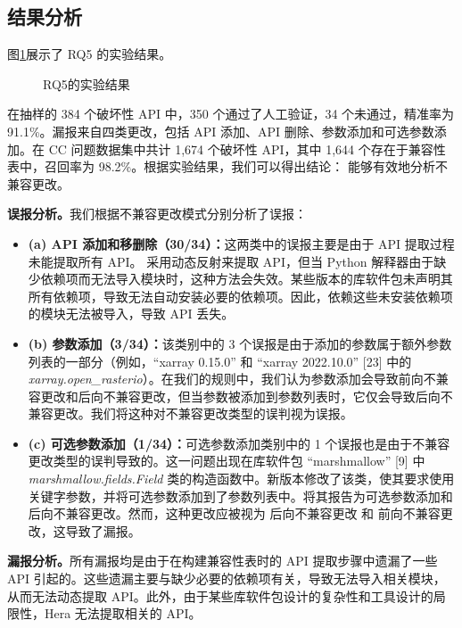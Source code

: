 \subsection{结果分析}
图\ref{fig:RQ5}展示了 RQ5 的实验结果。
\begin{figure}[htbp]
	\centering
	\subfloat[分析不兼容更改的精确率]{
		\texttt{[image: RQ2-1]}
		\label{fig:RQ5-1}
	}\hspace{4em}
	\subfloat[分析不兼容更改的召回率]{
		\texttt{[image: RQ2-2]}
		\label{fig:RQ5-2}
	}
	\caption{RQ5的实验结果}
	\label{fig:RQ5}
\end{figure}
在抽样的 384 个破坏性 API 中，350 个通过了人工验证，34 个未通过，精准率为 91.1\%。漏报来自四类更改，包括 API 添加、API 删除、参数添加和可选参数添加。在 CC 问题数据集中共计 1,674 个破坏性 API，其中 1,644 个存在于兼容性表中，召回率为 98.2\%。根据实验结果，我们可以得出结论：\tool{} 能够有效地分析不兼容更改。

\textbf{误报分析。}我们根据不兼容更改模式分别分析了误报：
\begin{itemize}
	\item \textbf{(a) API 添加和移删除（30/34）：}这两类中的误报主要是由于 API 提取过程未能提取所有 API。\tool{} 采用动态反射来提取 API，但当 Python 解释器由于缺少依赖项而无法导入模块时，这种方法会失效。某些版本的库软件包未声明其所有依赖项，导致无法自动安装必要的依赖项。因此，依赖这些未安装依赖项的模块无法被导入，导致 API 丢失。
	\item \textbf{ (b) 参数添加（3/34）：}该类别中的 3 个误报是由于添加的参数属于额外参数列表的一部分（例如，“xarray 0.15.0” 和 “xarray 2022.10.0” [23] 中的 \textit{xarray.open\_rasterio}）。在我们的规则中，我们认为参数添加会导致前向不兼容更改和后向不兼容更改，但当参数被添加到参数列表时，它仅会导致后向不兼容更改。我们将这种对不兼容更改类型的误判视为误报。
	\item \textbf{ (c) 可选参数添加（1/34）：}可选参数添加类别中的 1 个误报也是由于不兼容更改类型的误判导致的。这一问题出现在库软件包 “marshmallow” [9] 中\textit{ marshmallow.fields.Field} 类的构造函数中。新版本修改了该类，使其要求使用关键字参数，并将可选参数添加到了参数列表中。\tool{}将其报告为可选参数添加和后向不兼容更改。然而，这种更改应被视为 后向不兼容更改 和 前向不兼容更改，这导致了漏报。
\end{itemize}

\textbf{漏报分析。}所有漏报均是由于在构建兼容性表时的 API 提取步骤中遗漏了一些 API 引起的。这些遗漏主要与缺少必要的依赖项有关，导致无法导入相关模块，从而无法动态提取 API。此外，由于某些库软件包设计的复杂性和工具设计的局限性，Hera 无法提取相关的 API。

